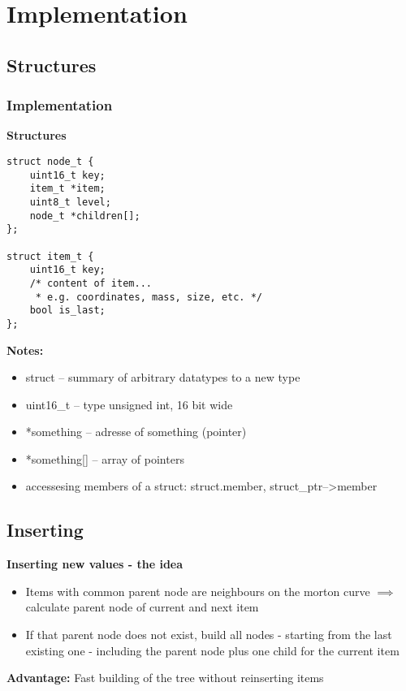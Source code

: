\section{Implementation}
\subsection{Structures}
\begin{frame}[fragile]
    \frametitle{Implementation}
    \textbf{Structures}
    \begin{verbatim}
struct node_t {
    uint16_t key;
    item_t *item;
    uint8_t level;
    node_t *children[];
};

struct item_t {
    uint16_t key;
    /* content of item...
     * e.g. coordinates, mass, size, etc. */
    bool is_last;
};
    \end{verbatim}
\end{frame}

\begin{frame}
    \textbf{Notes:}
    \begin{itemize}
        \item struct -- summary of arbitrary datatypes to a new type \\
        \item uint16\_t -- type unsigned int, 16 bit wide \\
        \item *something -- adresse of something (pointer) \\
        \item *something[] -- array of pointers
        \item accessesing members of a struct: struct.member,
            struct\_ptr-->member
    \end{itemize}
\end{frame}


\subsection{Inserting}
\begin{frame}
    \textbf{Inserting new values - the idea}
    \begin{itemize}
        \item Items with common parent node are neighbours on the morton curve
            $\implies$ calculate parent node of current and next item \\
        \item If that parent node does not exist, build all nodes - starting from
            the last existing one - including the parent node plus one child
            for the current item
    \end{itemize}
    \textbf{Advantage:} Fast building of the tree without reinserting items
\end{frame}

